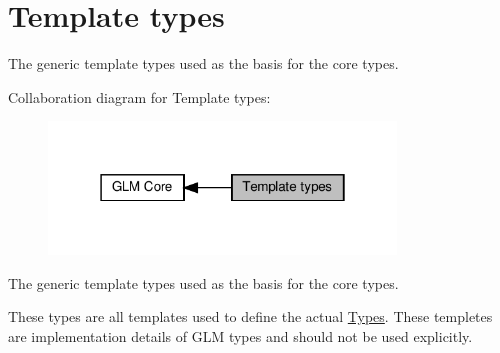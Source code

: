 \hypertarget{group__core__template}{}\section{Template types}
\label{group__core__template}


The generic template types used as the basis for the core types.  


Collaboration diagram for Template types\+:\nopagebreak
\begin{figure}[H]
\begin{center}
\leavevmode
\includegraphics[width=262pt]{group__core__template}
\end{center}
\end{figure}
The generic template types used as the basis for the core types. 

These types are all templates used to define the actual \hyperlink{group__core__types}{Types}. These templetes are implementation details of G\+LM types and should not be used explicitly. 